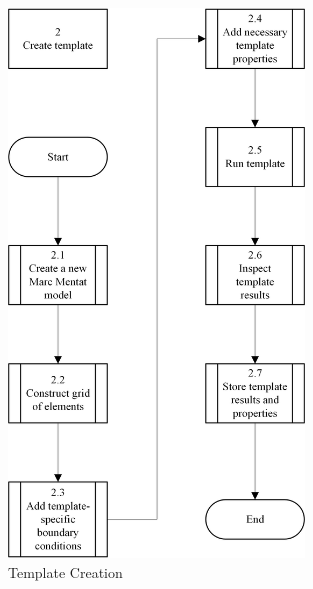 \begin{figure}[H]
\centering
	\includegraphics[width=0.7\textwidth]{sp2.png}
	\caption{Template Creation}
	\label{fig:sp2}
\end{figure}

